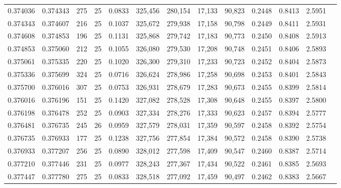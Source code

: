 \begin{tabular}{rrrrrrrrrrrrr}
0.374036 & 0.374343 &   275 &  25 &                                     0.0833 & 325,456 & 280,154 &  17,133 &  90,823 & 0.2448 & 0.8413 & 2.5951 \\
0.374343 & 0.374607 &   216 &  25 &                                     0.1037 & 325,672 & 279,938 &  17,158 &  90,798 & 0.2449 & 0.8411 & 2.5931 \\
0.374608 & 0.374853 &   196 &  25 &                                     0.1131 & 325,868 & 279,742 &  17,183 &  90,773 & 0.2450 & 0.8408 & 2.5913 \\
0.374853 & 0.375060 &   212 &  25 &                                     0.1055 & 326,080 & 279,530 &  17,208 &  90,748 & 0.2451 & 0.8406 & 2.5893 \\
0.375061 & 0.375335 &   220 &  25 &                                     0.1020 & 326,300 & 279,310 &  17,233 &  90,723 & 0.2452 & 0.8404 & 2.5873 \\
0.375336 & 0.375699 &   324 &  25 &                                     0.0716 & 326,624 & 278,986 &  17,258 &  90,698 & 0.2453 & 0.8401 & 2.5843 \\
0.375700 & 0.376016 &   307 &  25 &                                     0.0753 & 326,931 & 278,679 &  17,283 &  90,673 & 0.2455 & 0.8399 & 2.5814 \\
0.376016 & 0.376196 &   151 &  25 &                                     0.1420 & 327,082 & 278,528 &  17,308 &  90,648 & 0.2455 & 0.8397 & 2.5800 \\
0.376198 & 0.376478 &   252 &  25 &                                     0.0903 & 327,334 & 278,276 &  17,333 &  90,623 & 0.2457 & 0.8394 & 2.5777 \\
0.376481 & 0.376735 &   245 &  26 &                                     0.0959 & 327,579 & 278,031 &  17,359 &  90,597 & 0.2458 & 0.8392 & 2.5754 \\
0.376735 & 0.376933 &   177 &  25 &                                     0.1238 & 327,756 & 277,854 &  17,384 &  90,572 & 0.2458 & 0.8390 & 2.5738 \\
0.376933 & 0.377207 &   256 &  25 &                                     0.0890 & 328,012 & 277,598 &  17,409 &  90,547 & 0.2460 & 0.8387 & 2.5714 \\
0.377210 & 0.377446 &   231 &  25 &                                     0.0977 & 328,243 & 277,367 &  17,434 &  90,522 & 0.2461 & 0.8385 & 2.5693 \\
0.377447 & 0.377780 &   275 &  25 &                                     0.0833 & 328,518 & 277,092 &  17,459 &  90,497 & 0.2462 & 0.8383 & 2.5667 \\

\end{tabular}
